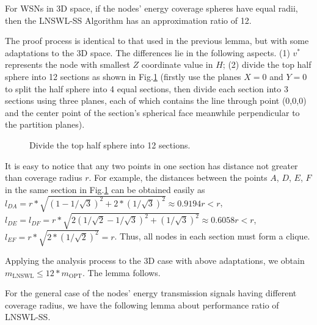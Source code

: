 \documentclass[journal,10pt]{IEEEtran}
\begin{document}
\begin{lemma}
\label{lemma_3d_ratio12}
For WSNs in 3D space, if the nodes' energy coverage spheres have equal radii, then the LNSWL-SS Algorithm has an approximation ratio of 12.
\end{lemma}

\begin{IEEEproof}
The proof process is identical to that used in the previous lemma, but with some adaptations to the 3D space. The differences lie in the following aspects. (1) $v^{*}$ represents the node with smallest $Z$ coordinate value in $H$; (2) divide the top half sphere into 12 sections as shown in Fig.\ref{fig_3d12part} (firstly use the planes $X{=}0$ and $Y{=}0$ to split the half sphere into 4 equal sections, then divide each section into 3 sections using three planes, each of which contains the line through point (0,0,0) and the center point of the section's spherical face meanwhile perpendicular to the partition planes).

\begin{figure}[htb]
\caption{Divide the top half sphere into 12 sections.}
\label{fig_3d12part}
\end{figure}

It is easy to notice that any two points in one section has distance not greater than coverage radius $r$. For example, the distances between the points $A$, $D$, $E$, $F$ in the same section in Fig.\ref{fig_3d12part} can be obtained easily as $l_{DA}{=}r{*}\sqrt{(1{-}1/\sqrt{3})^2{+}2*(1/\sqrt{3})^2}{\approx}0.9194r{<}r$, $l_{DE}{=}l_{DF}{=}r{*}\sqrt{2(1/\sqrt{2}{-}1/\sqrt{3})^2{+}(1/\sqrt{3})^2}{\approx}0.6058r{<}r$, $l_{EF}{=}r{*}\sqrt{2{*}(1/\sqrt{2})^2}{=}r$. Thus, all nodes in each section must form a clique.

Applying the analysis process to the 3D case with above adaptations, we obtain $m_\text{LNSWL}{\leq}12{*}m_\text{OPT}$. The lemma follows.
\end{IEEEproof}

For the general case of the nodes' energy transmission signals having different coverage radius, we have the following lemma about performance ratio of LNSWL-SS.
\end{document}
